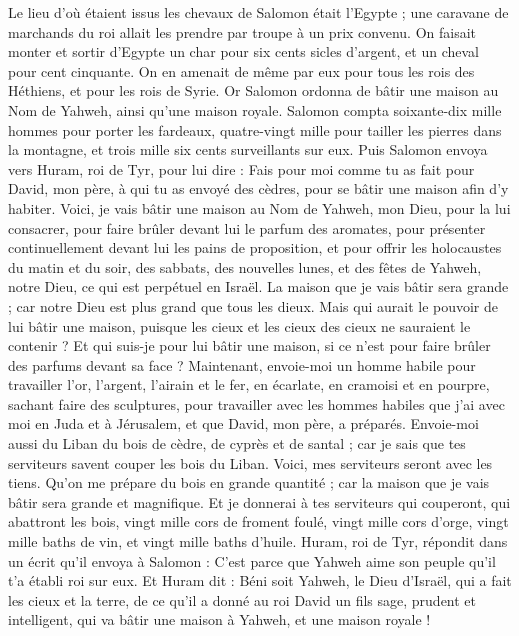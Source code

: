 \begin{multicols}{2}
Le lieu d'où étaient issus les chevaux de Salomon était l'Egypte ; une caravane de marchands du roi allait les prendre par troupe à un prix convenu.
On faisait monter et sortir d'Egypte un char pour six cents sicles d'argent, et un cheval pour cent cinquante. On en amenait de même par eux pour tous les rois des Héthiens, et pour les rois de Syrie.
\VerseOne{}Or Salomon ordonna de bâtir une maison au Nom de Yahweh, ainsi qu'une maison royale.
Salomon compta soixante-dix mille hommes pour porter les fardeaux, quatre-vingt mille pour tailler les pierres dans la montagne, et trois mille six cents surveillants sur eux.
Puis Salomon envoya vers Huram, roi de Tyr, pour lui dire : Fais pour moi comme tu as fait pour David, mon père, à qui tu as envoyé des cèdres, pour se bâtir une maison afin d'y habiter.
Voici, je vais bâtir une maison au Nom de Yahweh, mon Dieu, pour la lui consacrer, pour faire brûler devant lui le parfum des aromates, pour présenter continuellement devant lui les pains de proposition, et pour offrir les holocaustes du matin et du soir, des sabbats, des nouvelles lunes, et des fêtes de Yahweh, notre Dieu, ce qui est perpétuel en Israël.
La maison que je vais bâtir sera grande ; car notre Dieu est plus grand que tous les dieux.
Mais qui aurait le pouvoir de lui bâtir une maison, puisque les cieux et les cieux des cieux ne sauraient le contenir ? Et qui suis-je pour lui bâtir une maison, si ce n'est pour faire brûler des parfums devant sa face ?
Maintenant, envoie-moi un homme habile pour travailler l'or, l'argent, l'airain et le fer, en écarlate, en cramoisi et en pourpre, sachant faire des sculptures, pour travailler avec les hommes habiles que j'ai avec moi en Juda et à Jérusalem, et que David, mon père, a préparés.
Envoie-moi aussi du Liban du bois de cèdre, de cyprès et de santal ; car je sais que tes serviteurs savent couper les bois du Liban. Voici, mes serviteurs seront avec les tiens.
Qu'on me prépare du bois en grande quantité ; car la maison que je vais bâtir sera grande et magnifique.
Et je donnerai à tes serviteurs qui couperont, qui abattront les bois, vingt mille cors de froment foulé, vingt mille cors d'orge, vingt mille baths de vin, et vingt mille baths d'huile.
Huram, roi de Tyr, répondit dans un écrit qu'il envoya à Salomon : C'est parce que Yahweh aime son peuple qu'il t'a établi roi sur eux.
Et Huram dit : Béni soit Yahweh, le Dieu d'Israël, qui a fait les cieux et la terre, de ce qu'il a donné au roi David un fils sage, prudent et intelligent, qui va bâtir une maison à Yahweh, et une maison royale !

\end{multicols}

